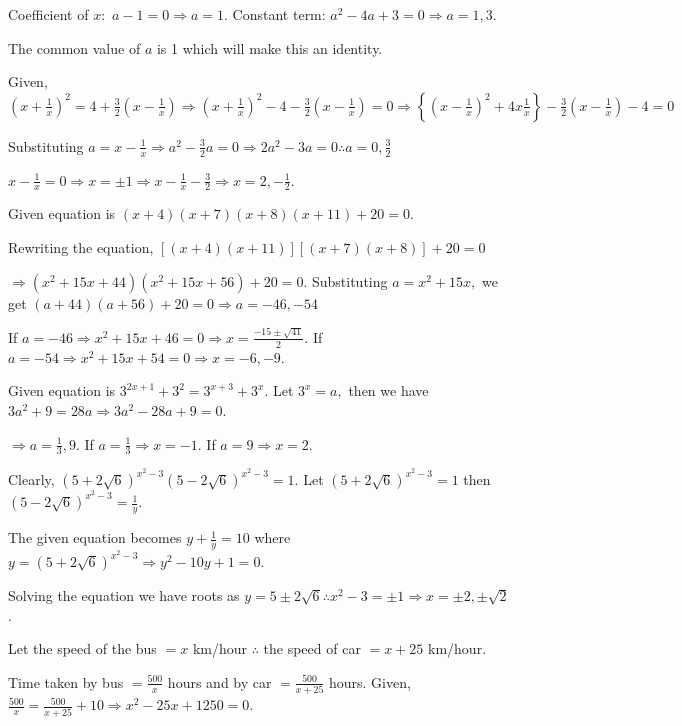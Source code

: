   Coefficient of $x:$ $a - 1 = 0 \Rightarrow a = 1$. Constant term: $a^2 - 4a + 3 = 0 \Rightarrow a = 1, 3$.

  The common value of $a$ is 1 which will make this an identity.
\item Given, $\left(x + \frac{1}{x}\right)^2 = 4 + \frac{3}{2}\left(x - \frac{1}{x}\right)\Rightarrow
  \left(x + \frac{1}{x}\right)^2 - 4 - \frac{3}{2}\left(x - \frac{1}{x}\right) = 0\Rightarrow \left\{\left(x
  - \frac{1}{x}\right)^2 + 4x\frac{1}{x}\right\} - \frac{3}{2}\left(x - \frac{1}{x}\right) - 4 = 0$

  Substituting $a = x - \frac{1}{x}\Rightarrow a^2 - \frac{3}{2}a = 0 \Rightarrow 2a^2 - 3a = 0 \therefore a
  = 0, \frac{3}{2}$

  $x - \frac{1}{x} = 0 \Rightarrow x = \pm1\Rightarrow x - \frac{1}{x} - \frac{3}{2} \Rightarrow x = 2,
  -\frac{1}{2}$.
\item Given equation is $(x + 4)(x + 7)(x + 8)(x + 11) + 20 = 0$.

  Rewriting the equation, $[(x + 4)(x + 11)][(x + 7)(x + 8)] + 20 = 0$

  $\Rightarrow (x^2 + 15x + 44)(x^2 + 15x + 56) + 20 = 0$. Substituting $a = x^2 + 15x,$ we get $(a + 44)(a
  + 56) + 20 = 0\Rightarrow a = -46, -54$

  If $a = -46 \Rightarrow x^2 + 15x + 46 = 0 \Rightarrow x = \frac{-15 \pm \sqrt{41}}{2}$. If $a = -54
  \Rightarrow x^2 + 15x + 54 = 0 \Rightarrow x = - 6, -9$.
\item Given equation is $3^{2x + 1} + 3^2 = 3^{x + 3} + 3^x$. Let $3^x = a,$ then we have $3a^2 + 9 = 28a
  \Rightarrow 3a^2 - 28a + 9 = 0$.

  $\Rightarrow a = \frac{1}{3}, 9$. If $a = \frac{1}{3} \Rightarrow x = -1$. If $a = 9 \Rightarrow x = 2$.
\item Clearly, $(5 + 2\sqrt{6})^{x^2 - 3}(5 - 2\sqrt{6})^{x^2 - 3} = 1$. Let $(5 + 2\sqrt{6})^{x^2 - 3} = 1$
  then $(5 - 2\sqrt{6})^{x^2 - 3} = \frac{1}{y}$.

  The given equation becomes $y + \frac{1}{y} = 10$ where $y = (5 + 2\sqrt{6})^{x^2 - 3}\Rightarrow y^2 -10y
  + 1 = 0$.

  Solving the equation we have roots as $y = 5 \pm 2\sqrt{6}\therefore x^2 - 3 = \pm 1\Rightarrow x = \pm2,
  \pm\sqrt{2}$.
\item Let the speed of the bus $= x$ km/hour $\therefore$ the speed of car $= x + 25$ km/hour.

  Time taken by bus $= \frac{500}{x}$ hours and by car $= \frac{500}{x + 25}$ hours. Given, $\frac{500}{x} =
  \frac{500}{x + 25} + 10\Rightarrow x^2 - 25x + 1250 = 0$.

